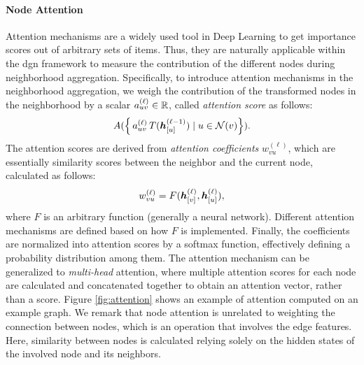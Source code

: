 \paragraph{Node Attention}
Attention mechanisms \citep{bahdanau2015attention} are a widely used tool in Deep Learning to get importance scores out of arbitrary sets of items. Thus, they are naturally applicable within the \gls{dgn} framework to measure the contribution of the different nodes during neighborhood aggregation. Specifically, to introduce attention mechanisms in the neighborhood aggregation, we weigh the contribution of the transformed nodes in the neighborhood by a scalar $a^{(\ell)}_{uv} \in \mathbb{R}$, called \emph{attention score} as follows:
$$A(\Set{\,a^{(\ell)}_{uv}\,T(\StateVector{u}{\ell-1}) \mid u \in \Neigh(v)}).$$
The attention scores are derived from \emph{attention coefficients} $w_{vu}^{(\ell)}$, which are essentially similarity scores between the neighbor and the current node, calculated as follows:
$$w_{vu}^{(\ell)} = F(\StateVector{v}{\ell}, \StateVector{u}{\ell}),$$
where $F$ is an arbitrary function (generally a neural network). Different attention mechanisms are defined based on how $F$ is implemented. Finally, the coefficients are normalized into attention scores by a softmax function, effectively defining a probability distribution among them. The attention mechanism can be generalized to \emph{multi-head} attention, where multiple attention scores for each node are calculated and concatenated together to obtain an attention vector, rather than a score. Figure \ref{fig:attention} shows an example of attention computed on an example graph. We remark that node attention is unrelated to weighting the connection between nodes, which is an operation that involves the edge features. Here, similarity between nodes is calculated relying solely on the hidden states of the involved node and its neighbors.

\begin{figure*}[h!]
    \centering
    \resizebox{.35\textwidth}{!}{}
    \caption{An example of node attention. Note that edge thickness is not related to the strength of the connection between node $v$ (in dark grey) and its neighbors (in light grey), but it represents the degree of similarity between the node states, quantified in a probabilistic sense by the attention score. Dashed edges connect nodes that are not involved in the attention score computation.}
    \label{fig:attention}
\end{figure*}

